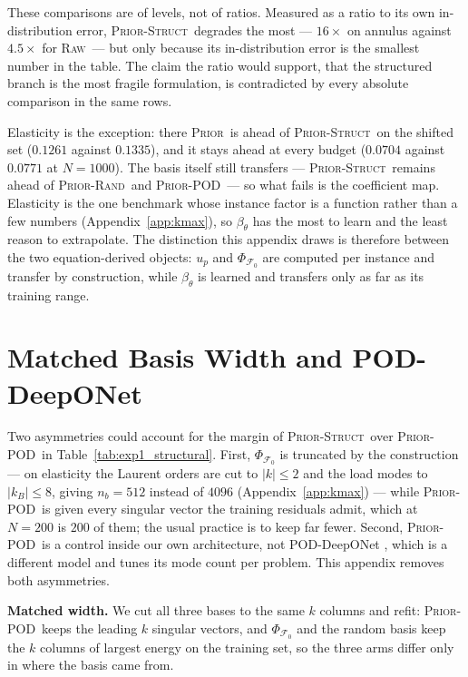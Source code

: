 \documentclass{article}
\newcommand{\armraw}{\textsc{Raw}}
\newcommand{\armprior}{\textsc{Prior}}
\newcommand{\armstruct}{\textsc{Prior-Struct}}
\newcommand{\armrand}{\textsc{Prior-Rand}}
\newcommand{\armpod}{\textsc{Prior-POD}}
\begin{document}
These comparisons are of levels, not of ratios. Measured as a ratio to its own in-distribution
error, \armstruct\ degrades the most --- $16\times$ on annulus against $4.5\times$ for
\armraw\ --- but only because its in-distribution error is the smallest number in the table. The
claim the ratio would support, that the structured branch is the most fragile formulation, is
contradicted by every absolute comparison in the same rows.

Elasticity is the exception: there \armprior\ is ahead of \armstruct\ on the shifted set
($0.1261$ against $0.1335$), and it stays ahead at every budget ($0.0704$ against $0.0771$ at
$N{=}1000$). The basis itself still transfers --- \armstruct\ remains ahead of \armrand\ and
\armpod\ --- so what fails is the coefficient map. Elasticity is the one benchmark whose
instance factor is a function rather than a few numbers (Appendix~\ref{app:kmax}), so
$\beta_\theta$ has the most to learn and the least reason to extrapolate. The distinction this
appendix draws is therefore between the two equation-derived objects: $u_p$ and
$\Phi_{\mathcal{F}_0}$ are computed per instance and transfer by construction, while
$\beta_\theta$ is learned and transfers only as far as its training range.

\section{Matched Basis Width and POD-DeepONet}
\label{app:width}

Two asymmetries could account for the margin of \armstruct\ over \armpod\ in
Table~\ref{tab:exp1_structural}. First, $\Phi_{\mathcal{F}_0}$ is truncated by the construction
--- on elasticity the Laurent orders are cut to $|k|\le2$ and the load modes to $|k_B|\le8$,
giving $n_b=512$ instead of $4096$ (Appendix~\ref{app:kmax}) --- while \armpod\ is given every
singular vector the training residuals admit, which at $N{=}200$ is $200$ of them; the usual
practice is to keep far fewer. Second, \armpod\ is a control inside our own architecture, not
POD-DeepONet \citep{lu2022}, which is a different model and tunes its mode count per problem.
This appendix removes both asymmetries.

\textbf{Matched width.} We cut all three bases to the same $k$ columns and refit: \armpod\ keeps
the leading $k$ singular vectors, and $\Phi_{\mathcal{F}_0}$ and the random basis keep the $k$
columns of largest energy on the training set, so the three arms differ only in where the basis
came from.
\end{document}
